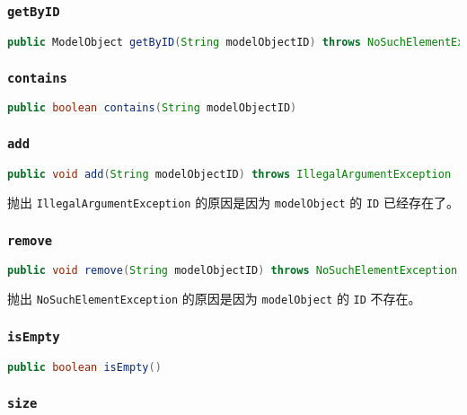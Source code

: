 \documentclass[hyperref,UTF8,12pt,a4paper]{ctexart}
\begin{document}
\subsubsection{\texttt{getByID}}

\begin{lstlisting}[language=Java]
    public ModelObject getByID(String modelObjectID) throws NoSuchElementException
\end{lstlisting}

\subsubsection{\texttt{contains}}

\begin{lstlisting}[language=Java]
	public boolean contains(String modelObjectID)
\end{lstlisting}

\subsubsection{\texttt{add}}

\begin{lstlisting}[language=Java]
    public void add(String modelObjectID) throws IllegalArgumentException
\end{lstlisting}

抛出 \texttt{IllegalArgumentException} 的原因是因为 \texttt{modelObject} 的 \texttt{ID} 已经存在了。

\subsubsection{\texttt{remove}}

\begin{lstlisting}[language=Java]
	public void remove(String modelObjectID) throws NoSuchElementException
\end{lstlisting}

抛出 \texttt{NoSuchElementException} 的原因是因为 \texttt{modelObject} 的 \texttt{ID} 不存在。

\subsubsection{\texttt{isEmpty}}
\begin{lstlisting}[language=Java]
    public boolean isEmpty()
\end{lstlisting}

\subsubsection{\texttt{size}}
\end{document}
